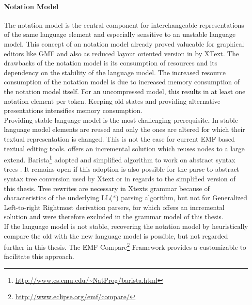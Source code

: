 \paragraph{Notation Model} The notation model is the central component for interchangeable representations of the same language element and especially sensitive to an unstable language model. This concept of an notation model already proved valueable for graphical editors like GMF and also as reduced layout oriented version in by XText. The drawbacks of the notation model is its consumption of resources and its dependency on the stability of the language model. The increased resource consumption of the notation model is due to increased memory consumption of the notation model itself. For an uncompressed model, this results in at least one notation element per token. Keeping old states and providing alternative presentations intensifies memory consumption. \\ %
Providing stable language model is the most challenging prerequisite. In stable language model elements are reused and only the ones are altered for which their textual representation is changed. This is not the case for current EMF based textual editing tools. \cite{iGLR} offers an incremental solution which reuses nodes to a large extend. Barista\footnote{\raggedright \url{http://www.cs.cmu.edu/~NatProg/barista.html}} adopted and simplified \cite{iGLR} algorithm to work on abstract syntax trees \cite{Barista}. It remains open if this adoption is also possible for the parse to abstract syntax tree conversion used by Xtext or in regards to the simplified  version of this thesis. Tree rewrites are necessary in Xtexts grammar because of characteristics of the underlying LL(*) parsing algorithm, but not for Generalized Left-to-right Rightmost derivation parsers, for which \cite{iGLR} offers an incremental solution and were therefore excluded in the grammar model of this thesis. \\%
If the language model is not stable, recovering the notation model by heuristically compare the old with the new language model is possible, but not regarded further in this thesis. The EMF Compare\footnote{\raggedright \url{http://www.eclipse.org/emf/compare/}} Framework provides a customizable  to facilitate this approach. \\
